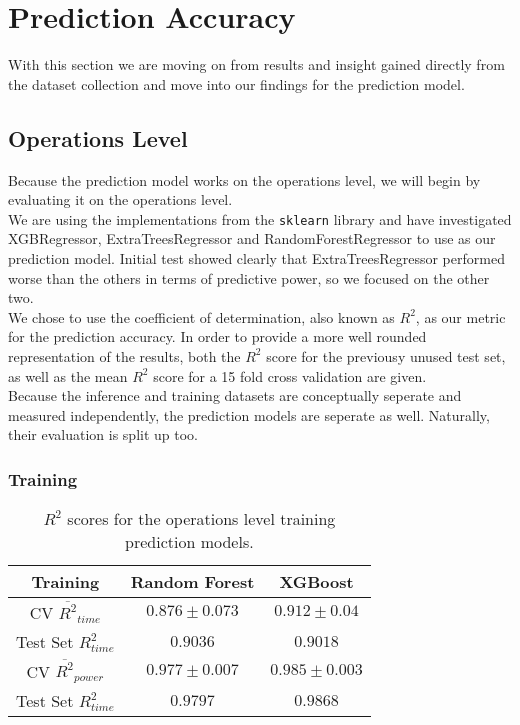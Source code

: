 \section{Prediction Accuracy}

With this section we are moving on from results and insight gained directly from the dataset collection and move into our findings for the prediction model.

\subsection{Operations Level}

Because the prediction model works on the operations level, we will begin by evaluating it on the operations level. \\
We are using the implementations from the \texttt{sklearn} library and have investigated XGBRegressor, ExtraTreesRegressor and RandomForestRegressor to use as our prediction model. Initial test showed clearly that ExtraTreesRegressor performed worse than the others in terms of predictive power, so we focused on the other two. \\
We chose to use the coefficient of determination, also known as $R^2$, as our metric for the prediction accuracy. In order to provide a more well rounded representation of the results, both the $R^2$ score for the previousy unused test set, as well as the mean $R^2$ score for a 15 fold cross validation are given. \\
Because the inference and training datasets are conceptually seperate and measured independently, the prediction models are seperate as well. Naturally,  their evaluation is split up too.

\subsubsection{Training}



\begin{table}[h!]
\centering
\begin{tabular}{|c|c|c|}
\hline
 \textbf{Training}& \textbf{Random Forest} & \textbf{XGBoost} \\
\hline
CV $\overline{R^2}_{time}$ & $0.876 \pm 0.073$ &  $0.912 \pm 0.04$ \\
\hline
Test Set $R^2_{time}$ & $0.9036$ & $0.9018$ \\
\hline
CV $\overline{R^2}_{power}$ & $0.977 \pm 0.007$  &  $0.985 \pm 0.003$\\
\hline
Test Set $R^2_{time}$ & $0.9797$ & $0.9868$ \\
\hline
\end{tabular}
\caption{$R^2$ scores for the operations level training prediction models.}
\label{tab:pred_res}
\end{table}


